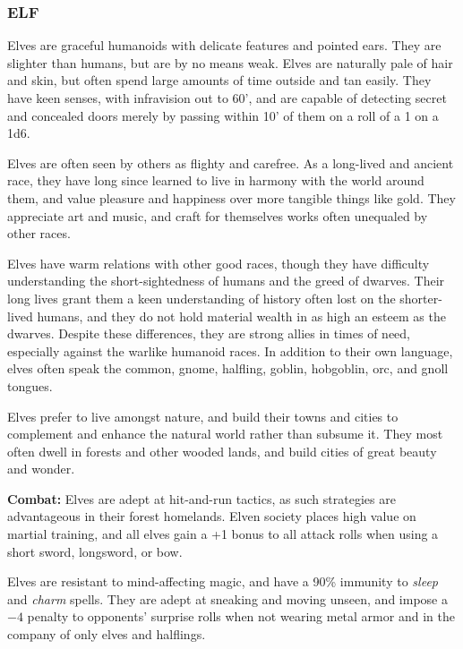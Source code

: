 \begin{multicols}{2}
\begin{minipage}{\columnwidth}
\end{minipage}

\subsubsection{ELF}

Elves are graceful humanoids with delicate features and pointed ears. They are slighter than humans, but are by no means weak. Elves are naturally pale of hair and skin, but often spend large amounts of time outside and tan easily. They have keen senses, with infravision out to 60', and are capable of detecting secret and concealed doors merely by passing within 10' of them on a roll of a 1 on a 1d6.

Elves are often seen by others as flighty and carefree. As a long-lived and ancient race, they have long since learned to live in harmony with the world around them, and value pleasure and happiness over more tangible things like gold. They appreciate art and music, and craft for themselves works often unequaled by other races.

Elves have warm relations with other good races, though they have difficulty understanding the short-sightedness of humans and the greed of dwarves. Their long lives grant them a keen understanding of history often lost on the shorter-lived humans, and they do not hold material wealth in as high an esteem as the dwarves. Despite these differences, they are strong allies in times of need, especially against the warlike humanoid races. In addition to their own language, elves often speak the common, gnome, halfling, goblin, hobgoblin, orc, and gnoll tongues.

Elves prefer to live amongst nature, and build their towns and cities to complement and enhance the natural world rather than subsume it. They most often dwell in forests and other wooded lands, and build cities of great beauty and wonder.

\textbf{Combat:} Elves are adept at hit-and-run tactics, as such strategies are advantageous in their forest homelands. Elven society places high value on martial training, and all elves gain a +1 bonus to all attack rolls when using a short sword, longsword, or bow.

Elves are resistant to mind-affecting magic, and have a 90\% immunity to \textit{sleep} and \textit{charm} spells. They are adept at sneaking and moving unseen, and impose a $-4$ penalty to opponents' surprise rolls when not wearing metal armor and in the company of only elves and halflings.


\end{multicols}

